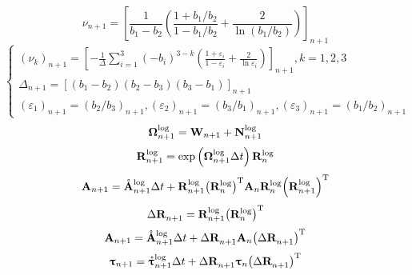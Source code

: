 \begin{equation}
{\nu _{n + 1}} = {\left[ {\frac{1}{{{b_1} - {b_2}}}\left( {\frac{{1 + {b_1}/{b_2}}}{{1 - {b_1}/{b_2}}} + \frac{2}{{\ln \left( {{b_1}/{b_2}} \right)}}} \right)} \right]_{n + 1}}
\end{equation}
\begin{equation}
\left\{ {\begin{array}{*{20}{l}}
{{{\left( {{\nu _k}} \right)}_{n + 1}} = {{\left[ { - \frac{1}{\Delta }\sum\limits_{i = 1}^3 {{{\left( { - {b_i}} \right)}^{3 - k}}\left( {\frac{{1 + {\varepsilon _i}}}{{1 - {\varepsilon _i}}} + \frac{2}{{\ln {\varepsilon _i}}}} \right)} } \right]}_{n + 1}},k = 1,2,3}\\
{{\Delta _{n + 1}} = {{\left[ {\left( {{b_1} - {b_2}} \right)\left( {{b_2} - {b_3}} \right)\left( {{b_3} - {b_1}} \right)} \right]}_{n + 1}}}\\
{{{\left( {{\varepsilon _1}} \right)}_{n + 1}} = {{\left( {{b_2}/{b_3}} \right)}_{n + 1}},{{\left( {{\varepsilon _2}} \right)}_{n + 1}} = {{\left( {{b_3}/{b_1}} \right)}_{n + 1}},{{\left( {{\varepsilon _3}} \right)}_{n + 1}} = {{\left( {{b_1}/{b_2}} \right)}_{n + 1}}}
\end{array}} \right.
\end{equation}
\begin{equation}
{\bf{\Omega }}_{n + 1}^{\log } = {{\bf{W}}_{n + 1}} + {\bf{N}}_{n + 1}^{\log }
\end{equation}
\begin{equation}
{\bf{R}}_{n + 1}^{\log } = \exp \left( {{\bf{\Omega }}_{n + 1}^{\log }\Delta t} \right){\bf{R}}_n^{\log }
\end{equation}
\begin{equation}
{{\bf{A}}_{n + 1}} = \mathring {\mathbf{A}}_{n + 1}^{\log }\Delta t + {\bf{R}}_{n + 1}^{\log }{\left( {{\bf{R}}_n^{\log }} \right)^{\rm{T}}}{{\bf{A}}_n}{\bf{R}}_n^{\log }{\left( {{\bf{R}}_{n + 1}^{\log }} \right)^{\rm{T}}}
\end{equation}
\begin{equation}
\Delta {\bf{R}}_{n + 1}^{} = {\bf{R}}_{n + 1}^{\log }{\left( {{\bf{R}}_n^{\log }} \right)^{\rm{T}}}
\end{equation}
\begin{equation}
{{\bf{A}}_{n + 1}} = \mathring {\mathbf{A}}_{n + 1}^{\log } \Delta t + \Delta {\bf{R}}_{n + 1}^{}{{\bf{A}}_n}{\left( {\Delta {\bf{R}}_{n + 1}^{}} \right)^{\rm{T}}}
\end{equation}
\begin{equation}
{{\bm{\uptau }}_{n + 1}} = \mathring {\bm{\uptau}}_{n + 1}^{\log }\Delta t + \Delta {\mathbf{R}}_{n + 1}^{}{{\bm{\uptau }}_n}{\left( {\Delta {\mathbf{R}}_{n + 1}^{}} \right)^{\rm{T}}}
\end{equation}
